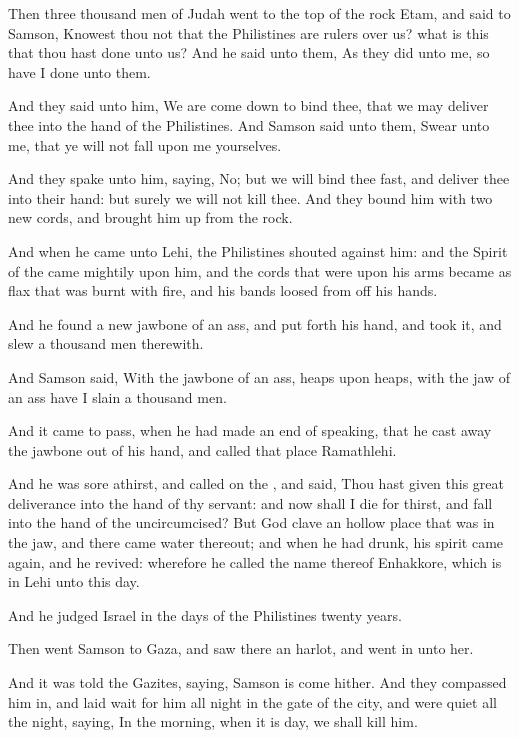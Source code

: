 \Verse Then three thousand men of Judah went to the top of the rock Etam, and said to Samson, Knowest thou not that the Philistines are rulers over us? what is this that thou hast done unto us? And he said unto them, As they did unto me, so have I done unto them.

\Verse And they said unto him, We are come down to bind thee, that we may deliver thee into the hand of the Philistines. And Samson said unto them, Swear unto me, that ye will not fall upon me yourselves.

\Verse And they spake unto him, saying, No; but we will bind thee fast, and deliver thee into their hand: but surely we will not kill thee.  And they bound him with two new cords, and brought him up from the rock.

\Verse And when he came unto Lehi, the Philistines shouted against him: and the Spirit of the \LORD came mightily upon him, and the cords that were upon his arms became as flax that was burnt with fire, and his bands loosed from off his hands.

\Verse And he found a new jawbone of an ass, and put forth his hand, and took it, and slew a thousand men therewith.

\Verse And Samson said, With the jawbone of an ass, heaps upon heaps, with the jaw of an ass have I slain a thousand men.

\Verse And it came to pass, when he had made an end of speaking, that he cast away the jawbone out of his hand, and called that place Ramathlehi.

\Verse And he was sore athirst, and called on the \LORD, and said, Thou hast given this great deliverance into the hand of thy servant: and now shall I die for thirst, and fall into the hand of the uncircumcised?  \Verse But God clave an hollow place that was in the jaw, and there came water thereout; and when he had drunk, his spirit came again, and he revived: wherefore he called the name thereof Enhakkore, which is in Lehi unto this day.

\Verse And he judged Israel in the days of the Philistines twenty years.


\Chapter
\Verse Then went Samson to Gaza, and saw there an harlot, and went in unto her.

\Verse And it was told the Gazites, saying, Samson is come hither. And they compassed him in, and laid wait for him all night in the gate of the city, and were quiet all the night, saying, In the morning, when it is day, we shall kill him.

